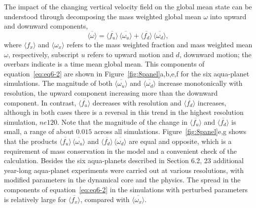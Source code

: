 The impact of the changing vertical velocity field on the global mean state can be understood through decomposing the mass weighted global mean $\omega$ into upward and downward components,
\begin{equation}
\overline{\langle \omega \rangle} = \overline{\langle f_{u} \rangle} \, \overline{\langle \omega_{u} \rangle} + \overline{\langle f_{d} \rangle} \, \overline{\langle \omega_{d} \rangle}, \label{eq:eq6-2}
\end{equation}
where $\langle f_x \rangle$ and $\langle \omega_x \rangle$ refers to the mass weighted fraction and mass weighted mean $\omega$, respectively, subscript $u$ refers to upward motion and $d$, downward motion; the overbars indicate is a time mean global mean. This components of equation~\ref{eq:eq6-2} are shown in Figure~\ref{fig:8panel}a,b,e,f for the six aqua-planet simulations. The magnitude of both $\overline{\langle \omega_{u} \rangle}$ and $\overline{\langle \omega_{d} \rangle}$ increase monotonically with resolution, the upward component increasing more than the downward component. In contrast, $\overline{\langle f_{u} \rangle}$ decreases with resolution and $\overline{\langle f_{d} \rangle}$ increases, although in both cases there is a reversal in this trend in the highest resolution simulation, $ne120$. Note that the magnitude of the change in $\overline{\langle f_{u} \rangle}$ and $\overline{\langle f_{d} \rangle}$ is small, a range of about $0.015$ across all simulations. Figure~\ref{fig:8panel}e,g shows that the products  $\overline{\langle f_{u} \rangle} \, \overline{\langle \omega_{u} \rangle}$ and $\overline{\langle f_{d} \rangle} \, \overline{\langle \omega_{d} \rangle}$ are equal and opposite, which is a requirement of mass conservation in the model and a convenient check of the calculation. Besides the six aqua-planets described in Section 6.2, 23 additional year-long aqua-planet experiments were carried out at various resolutions, with modified parameters in the dynamical core and the physics. The spread in the components of equation~\ref{eq:eq6-2} in the simulations with perturbed parameters is relatively large for $\overline{\langle f_{x} \rangle}$, compared with $\overline{\langle \omega_{x} \rangle}$.

